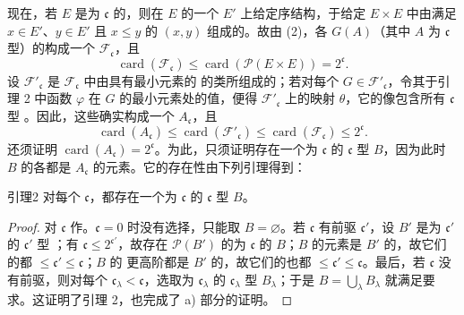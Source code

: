 现在，若 $E$ 是为 $\mathfrak{c}$ 的，则在 $E$ 的一个 $E'$ 上给定序结构，于给定 $E\times E$ 中由满足 $x\in E'$、$y\in E'$ 且 $x\leq y$ 的 $(x,y)$ 组成的。故由 (2)，各 $G(A)$（其中 $A$ 为 $\mathfrak{c}$ 型）的构成一个 $\mathscr F_{\mathfrak{c}}$，且
\[
 \operatorname{card}(\mathscr F_{\mathfrak{c}})\leq\operatorname{card}(\mathcal P(E\times E))=2^{\mathfrak{c}}.
\]
设 $\mathscr F'_{\mathfrak{c}}$ 是 $\mathscr F_{\mathfrak{c}}$ 中由具有最小元素的 的类所组成的；若对每个 $G\in\mathscr F'_{\mathfrak{c}}$，令其于引理 2 中函数 $\varphi$ 在 $G$ 的最小元素处的值，便得 $\mathscr F'_{\mathfrak{c}}$ 上的映射 $\theta$，它的像包含所有 $\mathfrak{c}$ 型 。因此，这些确实构成一个 $A_{\mathfrak{c}}$，且
\[
 \operatorname{card}(A_{\mathfrak{c}})\leq\operatorname{card}(\mathscr F'_{\mathfrak{c}})
 \leq\operatorname{card}(\mathscr F_{\mathfrak{c}})\leq2^{\mathfrak{c}}.
\]
还须证明 $\operatorname{card}(A_{\mathfrak{c}})=2^{\mathfrak{c}}$。为此，只须证明存在一个为 $\mathfrak{c}$ 的 $\mathfrak{c}$ 型  $B$，因为此时 $B$ 的各都是 $A_{\mathfrak{c}}$ 的元素。它的存在性由下列引理得到：
\begin{SGAresult}{引理}{2}
对每个 $\mathfrak{c}$，都存在一个为 $\mathfrak{c}$ 的 $\mathfrak{c}$ 型  $B$。
\end{SGAresult}
\begin{proof}
对 $\mathfrak{c}$ 作。$\mathfrak{c}=0$ 时没有选择，只能取 $B=\varnothing$。若 $\mathfrak{c}$ 有前驱 $\mathfrak{c}'$，设 $B'$ 是为 $\mathfrak{c}'$ 的 $\mathfrak{c}'$ 型 ；有 $\mathfrak{c}\leq2^{\mathfrak{c}'}$，故存在 $\mathcal P(B')$ 的为 $\mathfrak{c}$ 的 $B$；$B$ 的元素是 $B'$ 的，故它们的都 $\leq\mathfrak{c}'\leq\mathfrak{c}$；$B$ 的
更高阶都是 $B'$ 的，故它们的也都 $\leq\mathfrak{c}'\leq\mathfrak{c}$。最后，若 $\mathfrak{c}$ 没有前驱，则对每个 $\mathfrak{c}_\lambda<\mathfrak{c}$，选取为 $\mathfrak{c}_\lambda$ 的 $\mathfrak{c}_\lambda$ 型  $B_\lambda$；于是 $B=\bigcup_\lambda B_\lambda$ 就满足要求。这证明了引理 2，也完成了 a) 部分的证明。
\end{proof}
